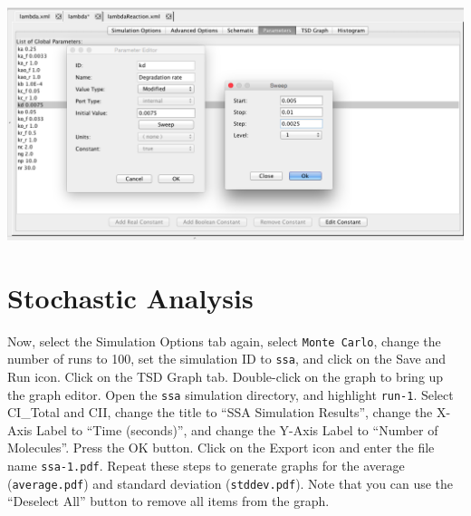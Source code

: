 \documentclass[titlepage,11pt]{article}
\begin{document}
\begin{center}
\includegraphics[width=160mm]{screenshots/parameterEditor}
\end{center}

\section{Stochastic Analysis}

Now, select the Simulation Options tab again, select {\tt Monte Carlo}, change the number of runs to 100, set the simulation ID to {\tt ssa}, and click on the Save and Run icon.  Click on the TSD Graph tab.  Double-click on the graph to bring up the graph editor.  Open the {\tt ssa} simulation directory, and highlight {\tt run-1}.  Select CI\_Total and CII, change the title to ``SSA Simulation Results'', change the X-Axis Label to ``Time (seconds)'', and change the Y-Axis Label to ``Number of Molecules''.  Press the OK button.  Click on the Export icon and enter the file name {\tt ssa-1.pdf}.  Repeat these steps to generate graphs for the average ({\tt average.pdf}) and standard deviation ({\tt stddev.pdf}).  Note that you can use the ``Deselect All'' button to remove all items from the graph.
\end{document}
